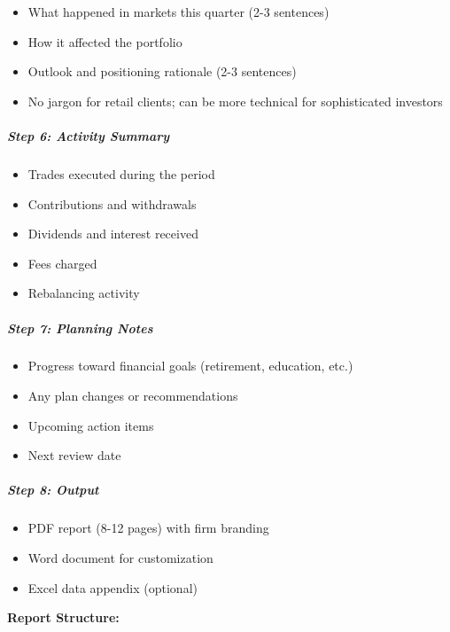\documentclass[11pt]{article}
\begin{document}
\begin{itemize}[leftmargin=*,itemsep=2pt,topsep=2pt]
\item {} What happened in markets this quarter (2-3 sentences)
\item {} How it affected the portfolio
\item {} Outlook and positioning rationale (2-3 sentences)
\item {} No jargon for retail clients; can be more technical for sophisticated investors
\end{itemize}

\subparagraph{Step 6: Activity Summary}\mbox{}\par

\begin{itemize}[leftmargin=*,itemsep=2pt,topsep=2pt]
\item {} Trades executed during the period
\item {} Contributions and withdrawals
\item {} Dividends and interest received
\item {} Fees charged
\item {} Rebalancing activity
\end{itemize}

\subparagraph{Step 7: Planning Notes}\mbox{}\par

\begin{itemize}[leftmargin=*,itemsep=2pt,topsep=2pt]
\item {} Progress toward financial goals (retirement, education, etc.)
\item {} Any plan changes or recommendations
\item {} Upcoming action items
\item {} Next review date
\end{itemize}

\subparagraph{Step 8: Output}\mbox{}\par

\begin{itemize}[leftmargin=*,itemsep=2pt,topsep=2pt]
\item {} PDF report (8-12 pages) with firm branding
\item {} Word document for customization
\item {} Excel data appendix (optional)
\end{itemize}

\textbf{Report Structure:}
\end{document}
